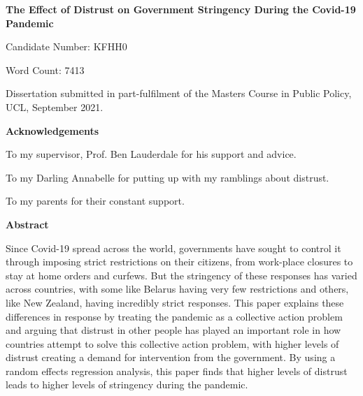 \begin{titlepage}
\begin{center}
\vspace*{5cm}
\LARGE
\textbf{The Effect of Distrust on Government Stringency During the Covid-19 Pandemic}


\vspace{1.5cm}
\large
Candidate Number: KFHH0

\vspace{0.5cm}
Word Count: 7413

\vfill

Dissertation submitted in part-fulfilment of the Masters Course in Public Policy, UCL,  September 2021.

\end{center}
\end{titlepage}

\begin{center}
\textbf{Acknowledgements}

To my supervisor, Prof. Ben Lauderdale for his support and advice.

To my Darling Annabelle for putting up with my ramblings about distrust.

To my parents for their constant support.
\end{center}

\pagebreak

\begin{center}
\vspace*{5cm}
\textbf{Abstract}
\end{center}
Since Covid-19 spread across the world, governments have sought to control it through imposing strict restrictions on their citizens, from work-place closures to stay at home orders and curfews. But the stringency of these responses has varied across countries, with some like Belarus having very few restrictions and others, like New Zealand, having incredibly strict responses. This paper explains these differences in response by treating the pandemic as a collective action problem and arguing that distrust in other people has played an important role in how countries attempt to solve this collective action problem, with higher levels of distrust creating a demand for intervention from the government. By using a random effects regression analysis, this paper finds that higher levels of distrust leads to higher levels of stringency during the pandemic.
\pagebreak